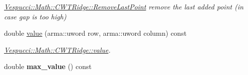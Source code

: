 \begin{DoxyCompactItemize}
\begin{DoxyCompactList}\small\item\em \hyperlink{class_vespucci_1_1_math_1_1_c_w_t_ridge_a039fef6b6678664d8bb8c019937bfbf9}{Vespucci\+::\+Math\+::\+C\+W\+T\+Ridge\+::\+Remove\+Last\+Point} remove the last added point (in case gap is too high) \end{DoxyCompactList}\item 
double \hyperlink{class_vespucci_1_1_math_1_1_c_w_t_ridge_a58ed7b3dc07c568c93daeb266f8b7e56}{value} (arma\+::uword row, arma\+::uword column) const 
\begin{DoxyCompactList}\small\item\em \hyperlink{class_vespucci_1_1_math_1_1_c_w_t_ridge_a58ed7b3dc07c568c93daeb266f8b7e56}{Vespucci\+::\+Math\+::\+C\+W\+T\+Ridge\+::value}. \end{DoxyCompactList}\item 
\hypertarget{class_vespucci_1_1_math_1_1_c_w_t_ridge_a2d15cfc146993348f43c1ca2786251cc}{double {\bfseries max\+\_\+value} () const }\label{class_vespucci_1_1_math_1_1_c_w_t_ridge_a2d15cfc146993348f43c1ca2786251cc}


\end{DoxyCompactItemize}
